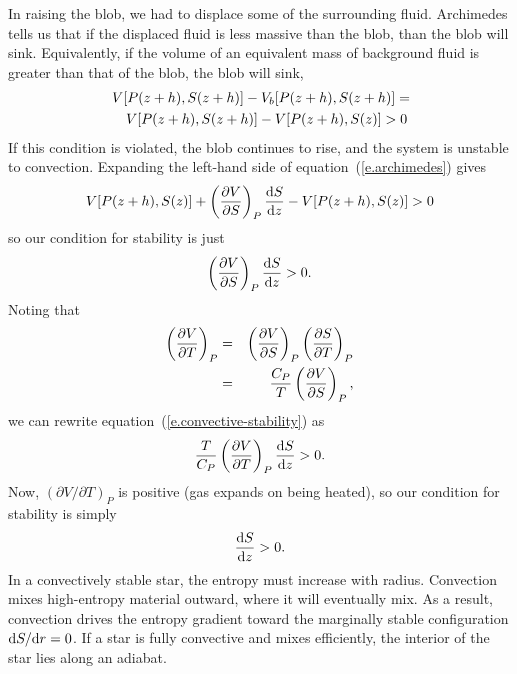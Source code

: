 In raising the blob, we had to displace some of the surrounding fluid. Archimedes tells us that if the displaced fluid is less massive than the blob, than the blob will sink.  Equivalently, if the volume of an equivalent mass of background fluid is greater than that of the blob, the blob will sink,
\begin{eqnarray}
\lefteqn{V[P(z+h),S(z+h)] - V_{b}[P(z+h),S(z+h)] =}\nonumber\\
&&  V[P(z+h),S(z+h)] - V[P(z+h),S(z)] > 0
\label{e.archimedes}
\end{eqnarray}
If this condition is violated, the blob continues to rise, and the system is unstable to convection.  Expanding the left-hand side of equation~(\ref{e.archimedes}) gives
\[
V[P(z+h),S(z)] + \left(\frac{\partial V}{\partial S}\right)_{P}\frac{\mathrm{d} S}{\mathrm{d} z} - V[P(z+h),S(z)] > 0 
\]
so our condition for stability is just
\begin{equation}\label{e.convective-stability}
\left(\frac{\partial V}{\partial S}\right)_{P}\frac{\mathrm{d} S}{\mathrm{d} z} > 0.
\end{equation}
Noting that
\begin{eqnarray*}
\left(\frac{\partial V}{\partial T}\right)_{P} &=& \left(\frac{\partial V}{\partial S}\right)_{P}\left(\frac{\partial S}{\partial T}\right)_{P}\\
 &=& \frac{C_{P}}{T}\left(\frac{\partial V}{\partial S}\right)_{P},
 \end{eqnarray*}
 we can rewrite equation~(\ref{e.convective-stability}) as
 \[
 \frac{T}{C_{P}}\left(\frac{\partial V}{\partial T}\right)_{P}\frac{\mathrm{d} S}{\mathrm{d} z} > 0.
 \]
 Now, $(\partial V/\partial T)_{P}$ is positive (gas expands on being heated), so our condition for stability is simply
 \begin{equation}\label{e.entropy-condition}
\frac{\mathrm{d} S}{\mathrm{d} z} > 0.
\end{equation}
In a convectively stable star, the entropy must increase with radius. Convection mixes high-entropy material outward, where it will eventually mix.  As a result, convection drives the entropy gradient toward the marginally stable configuration $\mathrm{d} S/\mathrm{d} r = 0$.  If a star is fully convective and mixes efficiently, the interior of the star lies along an adiabat. 

